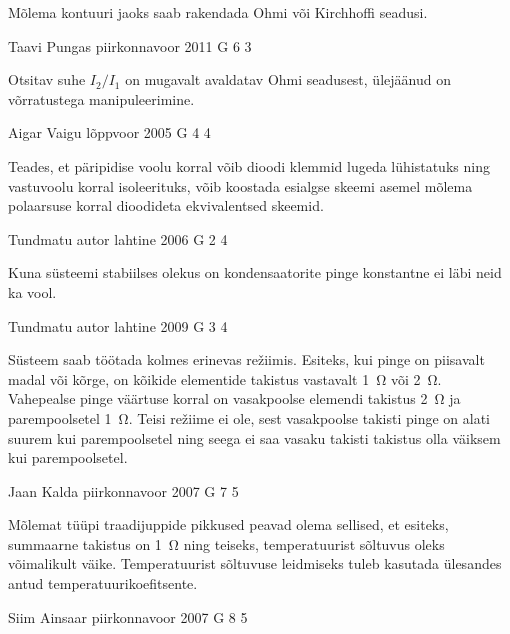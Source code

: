 \documentclass[11pt, twoside]{article}
\begin{document}
{{\ifHint
Mõlema kontuuri jaoks saab rakendada Ohmi või Kirchhoffi
seadusi.
\fi
}

{Taavi Pungas} %
{piirkonnavoor} %
{2011} %
{G 6} %
{3} %
{

\ifHint
Otsitav suhe $I_2/I_1$ on mugavalt avaldatav Ohmi seadusest, ülejäänud on võrratustega manipuleerimine.
\fi
}

{Aigar Vaigu} %
{lõppvoor} %
{2005} %
{G 4} %
{4} %
{

\ifHint
Teades, et päripidise voolu korral võib dioodi klemmid lugeda lühistatuks ning vastuvoolu korral isoleerituks, võib koostada esialgse skeemi asemel mõlema polaarsuse korral dioodideta ekvivalentsed skeemid.
\fi
}

{Tundmatu autor} %
{lahtine} %
{2006} %
{G 2} %
{4} %
{

\ifHint
Kuna süsteemi stabiilses olekus on kondensaatorite pinge konstantne ei läbi neid ka vool.
\fi
}

{Tundmatu autor} %
{lahtine} %
{2009} %
{G 3} %
{4} %
{

\ifHint
Süsteem saab töötada kolmes erinevas režiimis. Esiteks, kui pinge on piisavalt madal või kõrge, on kõikide elementide takistus vastavalt \SI{1}{\ohm} või \SI{2}{\ohm}. Vahepealse pinge väärtuse korral on vasakpoolse elemendi takistus \SI{2}{\ohm} ja parempoolsetel \SI{1}{\ohm}. Teisi režiime ei ole, sest vasakpoolse takisti pinge on alati suurem kui parempoolsetel ning seega ei saa vasaku takisti takistus olla väiksem kui parempoolsetel.
\fi
}

{Jaan Kalda} %
{piirkonnavoor} %
{2007} %
{G 7} %
{5} %
{

\ifHint
Mõlemat tüüpi traadijuppide pikkused peavad olema sellised, et esiteks, summaarne takistus on \SI{1}{\ohm} ning teiseks, temperatuurist sõltuvus oleks võimalikult väike. Temperatuurist sõltuvuse leidmiseks tuleb kasutada ülesandes antud temperatuurikoefitsente.
\fi
}

{Siim Ainsaar} %
{piirkonnavoor} %
{2007} %
{G 8} %
{5} %
{

}}
\end{document}
